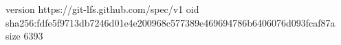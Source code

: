 version https://git-lfs.github.com/spec/v1
oid sha256:fdfe5f9713db7246d01e4e200968c577389e469694786b6406076d093fcaf87a
size 6393
